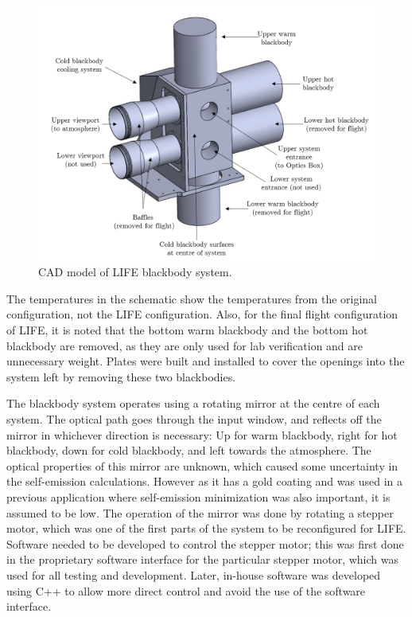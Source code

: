\begin{figure}
    \centering
    \includegraphics[width=\linewidth]{chap3_images/Blackbody_CAD_labelled_PNG.png}
    \caption{CAD model of LIFE blackbody system.}
    \label{fig:CAD_Blackbodies}
\end{figure}

The temperatures in the schematic show the temperatures from the original configuration, not the LIFE configuration. Also, for the final flight configuration of LIFE, it is noted that the bottom warm blackbody and the bottom hot blackbody are removed, as they are only used for lab verification and are unnecessary weight. Plates were built and installed to cover the openings into the system left by removing these two blackbodies.

The blackbody system operates using a rotating mirror at the centre of each system. The optical path goes through the input window, and reflects off the mirror in whichever direction is necessary: Up for warm blackbody, right for hot blackbody, down for cold blackbody, and left towards the atmosphere. The optical properties of this mirror are unknown, which caused some uncertainty in the self-emission calculations. However as it has a gold coating and was used in a previous application where self-emission minimization was also important, it is assumed to be low. The operation of the mirror was done by rotating a stepper motor, which was one of the first parts of the system to be reconfigured for LIFE. Software needed to be developed to control the stepper motor; this was first done in the proprietary software interface for the particular stepper motor, which was used for all testing and development. Later, in-house software was developed using C++ to allow more direct control and avoid the use of the software interface. 

